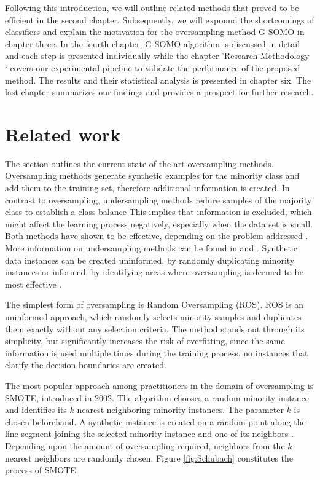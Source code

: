 \documentclass[parskip=full]{scrartcl}
\begin{document}
Following this introduction, we will outline related methods that proved to be
efficient in the second chapter. Subsequently, we will expound the shortcomings
of classifiers and explain the motivation for the oversampling method G-SOMO in
chapter three. In the fourth chapter, G-SOMO algorithm is discussed in detail
and each step is presented individually while the chapter 'Research Methodology
‘ covers our experimental pipeline to validate the performance of the proposed
method. The results and their statistical analysis is presented in chapter six.
The last chapter summarizes our findings and provides a prospect for further
research.

\section{Related work}

The section outlines the current state of the art oversampling methods.
Oversampling methods generate synthetic examples for the minority class and add
them to the training set, therefore additional information is created. In
contrast to oversampling, undersampling methods reduce samples of the majority
class to establish a class balance This implies that information is excluded,
which might affect the learning process negatively, especially when the data set
is small. Both methods have shown to be effective, depending on the problem
addressed \cite{Chawla2002}. More information on undersampling methods can be
found in \cite{Ganganwar2012} and \cite{Yen2006}. Synthetic data instances can
be created uninformed, by randomly duplicating minority instances or informed,
by identifying areas where oversampling is deemed to be most effective
\cite{Douzas2018}.

The simplest form of oversampling is Random Oversampling (ROS). ROS is an
uninformed approach, which randomly selects minority samples and duplicates them
exactly without any selection criteria. The method stands out through its
simplicity, but significantly increases the risk of overfitting, since the same
information is used multiple times during the training process, no instances
that clarify the decision boundaries are created. 

The most popular approach among practitioners in the domain of oversampling is
SMOTE, introduced in 2002. The algorithm chooses a random minority instance and
identifies its \( k \) nearest neighboring minority instances. The parameter \(k
\) is chosen beforehand. A synthetic instance is created on a random point along
the line segment joining the selected minority instance and one of its neighbors
\cite{Chawla2002}.  Depending upon the amount of oversampling required,
neighbors from the \( k \) nearest neighbors are randomly chosen. Figure
\ref{fig:Schubach} constitutes the process of SMOTE.
\end{document}
